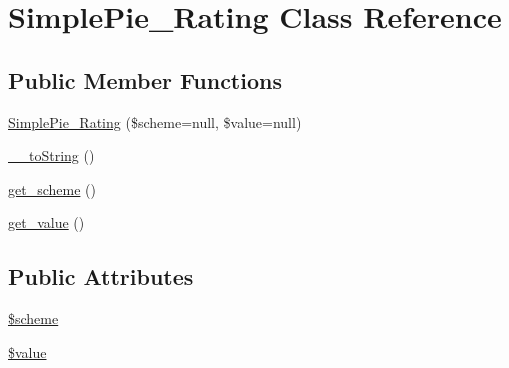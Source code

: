 \hypertarget{class_simple_pie___rating}{\section{Simple\-Pie\-\_\-\-Rating Class Reference}
\label{class_simple_pie___rating}
}
\subsection*{Public Member Functions}
\begin{DoxyCompactItemize}
\item 
\hyperlink{class_simple_pie___rating_adcb57cacf61fee992b94d26f3ff1aec9}{Simple\-Pie\-\_\-\-Rating} (\$scheme=null, \$value=null)
\item 
\hyperlink{class_simple_pie___rating_afcc3762237b1b303450c21b0a4772bb0}{\-\_\-\-\_\-to\-String} ()
\item 
\hyperlink{class_simple_pie___rating_a30465ee76c50d740f5af0df28029ab8c}{get\-\_\-scheme} ()
\item 
\hyperlink{class_simple_pie___rating_a3c5054c6d6122e94ff5cd74cec010740}{get\-\_\-value} ()
\end{DoxyCompactItemize}
\subsection*{Public Attributes}
\begin{DoxyCompactItemize}
\item 
\hyperlink{class_simple_pie___rating_a3ce509b841db70b6f13b7aba8a502e6b}{\$scheme}
\item 
\hyperlink{class_simple_pie___rating_abb41c3ced45f5ab8f1425b9230227bc5}{\$value}
\end{DoxyCompactItemize}


